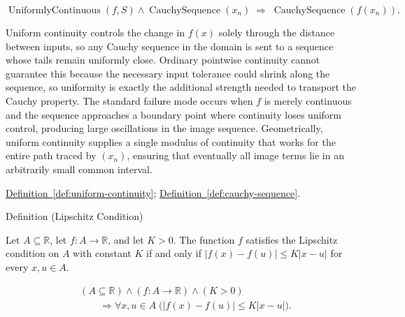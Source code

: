 \begin{remark*}
\[
\operatorname{UniformlyContinuous}(f,S) \land \operatorname{CauchySequence}(x_n) \;\Rightarrow\; \operatorname{CauchySequence}(f(x_n)).
\]
\end{remark*}

\begin{remark*}[Interpretation]
Uniform continuity controls the change in $f(x)$ solely through the distance between inputs, so any Cauchy sequence in the domain is sent to a sequence whose tails remain uniformly close. Ordinary pointwise continuity cannot guarantee this because the necessary input tolerance could shrink along the sequence, so uniformity is exactly the additional strength needed to transport the Cauchy property. The standard failure mode occurs when $f$ is merely continuous and the sequence approaches a boundary point where continuity loses uniform control, producing large oscillations in the image sequence. Geometrically, uniform continuity supplies a single modulus of continuity that works for the entire path traced by $(x_n)$, ensuring that eventually all image terms lie in an arbitrarily small common interval.
\end{remark*}

\begin{dependencies}
\hyperref[def:uniform-continuity]{Definition~\ref{def:uniform-continuity}};
\hyperref[def:cauchy-sequence]{Definition~\ref{def:cauchy-sequence}}.
\end{dependencies}


\begin{definitionbox}{Definition (Lipschitz Condition)}
\begin{definition}
\label{def:lipschitz-condition}
Let $A \subseteq \mathbb{R}$, let $f:A \to \mathbb{R}$, and let $K>0$. The function $f$ satisfies the Lipschitz condition on $A$ with constant $K$ if and only if $|f(x)-f(u)| \le K|x-u|$ for every $x,u \in A$.
\end{definition}
\end{definitionbox}

\begin{remark*}
\[
\begin{aligned}
&(A\subseteq\mathbb{R})\land(f:A\to\mathbb{R})\land(K>0)\\
&\qquad\Longrightarrow
\forall x,u \in A\;\bigl(|f(x)-f(u)| \le K|x-u|\bigr).
\end{aligned}
\]
\end{remark*}

